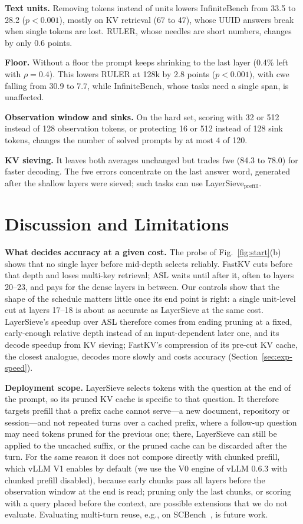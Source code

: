 \documentclass[10pt,conference]{IEEEtran}
\begin{document}
\textbf{Text units.} Removing tokens instead of units lowers InfiniteBench from 33.5 to 28.2 ($p<0.001$), mostly on KV retrieval (67 to 47), whose UUID answers break when single tokens are lost. RULER, whose needles are short numbers, changes by only 0.6 points.

\textbf{Floor.} Without a floor the prompt keeps shrinking to the last layer (0.4\% left with $\rho=0.4$). This lowers RULER at 128k by 2.8 points ($p<0.001$), with cwe falling from 30.9 to 7.7, while InfiniteBench, whose tasks need a single span, is unaffected.

\textbf{Observation window and sinks.} On the hard set, scoring with 32 or 512 instead of 128 observation tokens, or protecting 16 or 512 instead of 128 sink tokens, changes the number of solved prompts by at most 4 of 120.

\textbf{KV sieving.} It leaves both averages unchanged but trades fwe (84.3 to 78.0) for faster decoding. The fwe errors concentrate on the last answer word, generated after the shallow layers were sieved; such tasks can use LayerSieve$_{\text{prefill}}$.

\section{Discussion and Limitations}
\label{sec:discussion}

\textbf{What decides accuracy at a given cost.} The probe of Fig.~\ref{fig:start}(b) shows that no single layer before mid-depth selects reliably. FastKV cuts before that depth and loses multi-key retrieval; ASL waits until after it, often to layers 20--23, and pays for the dense layers in between. Our controls show that the shape of the schedule matters little once its end point is right: a single unit-level cut at layers 17--18 is about as accurate as LayerSieve at the same cost. LayerSieve's speedup over ASL therefore comes from ending pruning at a fixed, early-enough relative depth instead of an input-dependent later one, and its decode speedup from KV sieving; FastKV's compression of its pre-cut KV cache, the closest analogue, decodes more slowly and costs accuracy (Section~\ref{sec:exp-speed}).

\textbf{Deployment scope.} LayerSieve selects tokens with the question at the end of the prompt, so its pruned KV cache is specific to that question. It therefore targets prefill that a prefix cache cannot serve---a new document, repository or session---and not repeated turns over a cached prefix, where a follow-up question may need tokens pruned for the previous one; there, LayerSieve can still be applied to the uncached suffix, or the pruned cache can be discarded after the turn. For the same reason it does not compose directly with chunked prefill, which vLLM V1 enables by default (we use the V0 engine of vLLM 0.6.3 with chunked prefill disabled), because early chunks pass all layers before the observation window at the end is read; pruning only the last chunks, or scoring with a query placed before the context, are possible extensions that we do not evaluate. Evaluating multi-turn reuse, e.g., on SCBench~\cite{li2025scbench}, is future work.
\end{document}
